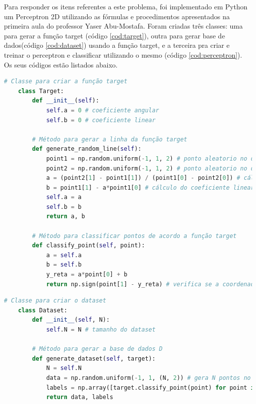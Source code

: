 Para responder os itens referentes a este problema, foi implementado em Python um Perceptron 2D utilizando as fórmulas e procedimentos apresentados na primeira aula do professor Yaser Abu-Mostafa. Foram criadas três classes: uma para gerar a função target (código \ref{cod:target}), outra para gerar base de dados(código \ref{cod:dataset}) usando a função target, e a terceira pra criar e treinar o perceptron e classificar utilizando o mesmo (código \ref{cod:perceptron}). Os seus códigos estão listados abaixo.

\begin{lstlisting}[language=Python, caption=Geração da função target $f$, label=cod:target]
    # Classe para criar a função target
    class Target:
        def __init__(self):
            self.a = 0 # coeficiente angular
            self.b = 0 # coeficiente linear
    
        # Método para gerar a linha da função target
        def generate_random_line(self):
            point1 = np.random.uniform(-1, 1, 2) # ponto aleatorio no domínio
            point2 = np.random.uniform(-1, 1, 2) # ponto aleatorio no domínio
            a = (point2[1] - point1[1]) / (point1[0] - point2[0]) # cálculo do coeficiente angular
            b = point1[1] - a*point1[0] # cálculo do coeficiente linear
            self.a = a
            self.b = b
            return a, b
        
        # Método para classificar pontos de acordo a função target
        def classify_point(self, point):
            a = self.a
            b = self.b
            y_reta = a*point[0] + b    
            return np.sign(point[1] - y_reta) # verifica se a coordenada y do ponto está acima ou abaixo da reta
\end{lstlisting}

\begin{lstlisting}[language=Python, caption=Geração do da base de dados $D$, label=cod:dataset]
    # Classe para criar o dataset
    class Dataset:
        def __init__(self, N): 
            self.N = N # tamanho do dataset
    
        # Método para gerar a base de dados D
        def generate_dataset(self, target):
            N = self.N
            data = np.random.uniform(-1, 1, (N, 2)) # gera N pontos no R2 com coordenadas entre [-1, 1]
            labels = np.array([target.classify_point(point) for point in data])
            return data, labels
\end{lstlisting}

